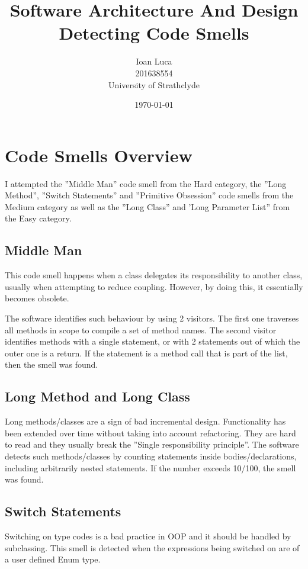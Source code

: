 \documentclass[a4paper]{article}
\begin{document}
\title{Software Architecture And Design \\ Detecting Code Smells}
\author{Ioan Luca \\ \small 201638554 \\ \small University of Strathclyde}
\date{\today}
\maketitle

\section{Code Smells Overview}
I attempted the ''Middle Man'' code smell from the Hard category,
the ''Long Method'', ''Switch Statements'' and ''Primitive Obsession'' code smells
from the Medium category as well as
the ''Long Class'' and 'Long Parameter List'' from the Easy category.

\subsection{Middle Man}
This code smell happens when a class delegates its responsibility to
another class, usually when attempting to reduce coupling. However, by
doing this, it essentially becomes obsolete.

The software identifies such behaviour by using 2 visitors.
The first one traverses all methods in scope to compile a set of 
method names.
The second visitor identifies methods with a single statement, or with 2
statements
out of which the outer one is a return.
If the statement is a method call that is part of the list, then the smell was
found.

\subsection{Long Method and Long Class}
Long methods/classes are a sign of bad incremental design.
Functionality has been
extended over time without taking into account refactoring.
They are hard to read and they usually break the
''Single responsibility principle''.
The software detects such methods/classes by counting statements inside 
bodies/declarations, including arbitrarily nested statements.
If the number exceeds 10/100, the smell was found.

\subsection{Switch Statements}
Switching on type codes is a bad practice in OOP and it should be handled by
subclassing.
This smell is detected when the expressions being switched on are of
a user defined Enum type.
\end{document}
